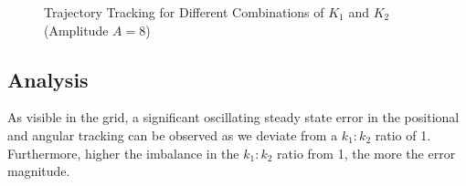 \documentclass[12pt]{article}
\begin{document}
\begin{figure}[H]
     \hfill
     \hfill
     \hfill
     \hfill

    \caption{Trajectory Tracking for Different Combinations of $K_1$ and $K_2$ (Amplitude $A=8$)}
\end{figure}

\subsection{Analysis}

As visible in the grid, a significant oscillating steady state error in the positional and angular tracking can be observed as we deviate from a \(k_1:k_2\) ratio of 1. Furthermore, higher the imbalance in the \(k_1:k_2\) ratio from 1, the more the error magnitude.\\
\end{document}
